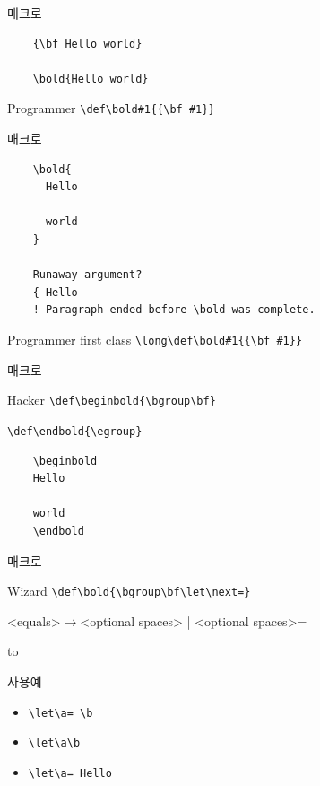 \documentclass{beamer}
\begin{document}
%


%
\begin{frame}[fragile]{\texttt{\string\bold} 매크로}
  \begin{verbatim}
    {\bf Hello world}
    
    \bold{Hello world}
  \end{verbatim}
  \begin{exampleblock}{Programmer}
    \verb+\def\bold#1{{\bf #1}}+
  \end{exampleblock}
\end{frame}


%
\begin{frame}[fragile]{\texttt{\string\bold} 매크로}
  \begin{verbatim}
    \bold{
      Hello

      world
    }

    Runaway argument?
    { Hello
    ! Paragraph ended before \bold was complete.
  \end{verbatim}
  \begin{exampleblock}{Programmer first class}
    \verb+\long\def\bold#1{{\bf #1}}+
  \end{exampleblock}
\end{frame}


%
\begin{frame}[fragile]{\texttt{\string\bold} 매크로}
  \begin{exampleblock}{Hacker}
    \verb+\def\beginbold{\bgroup\bf}+
    
    \verb+\def\endbold{\egroup}+
  \end{exampleblock}

  \begin{verbatim}
    \beginbold
    Hello

    world
    \endbold
  \end{verbatim}
\end{frame}


%
\begin{frame}[fragile]{\texttt{\string\bold} 매크로}
  \begin{exampleblock}{Wizard}
    \verb+\def\bold{\bgroup\bf\let\next=}+
  \end{exampleblock}
  \medskip
  <equals>$\rightarrow$<optional spaces> | <optional spaces>=
  
  \hbox to
  \medskip

  \begin{exampleblock}{사용예}
    \begin{itemize}
    \item \verb*+\let\a= \b+
    \item \verb*+\let\a\b+
    \item \verb*+\let\a= Hello+
    \end{itemize}
  \end{exampleblock}
\end{frame}
\end{document}
